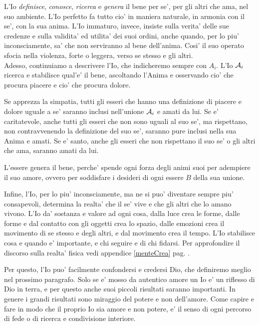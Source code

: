     L'Io \emph{definisce}, \emph{conosce}, \emph{ricerca} e \emph{genera} il bene per se', per gli altri che ama, nel suo ambiente. L'Io perfetto fa tutto cio' in maniera naturale, in armonia con il se', con la sua anima. L'Io immaturo, invece, insiste sulla verita' delle sue credenze e sulla validita' ed utilita' dei suoi ordini, anche quando, per lo piu' inconsciamente, sa' che non serviranno al bene dell'anima. Cosi' il suo operato sfocia nella violenza, forte o leggera, verso se stesso e gli altri.\\

Adesso, continuiamo a descrivere l'Io, che indicheremo sempre con $A_i$. L'Io $\mathcal{A}_i$ ricerca e stabilisce qual'e' il bene, ascoltando l'Anima e osservando cio' che procura piacere e cio' che procura dolore. 

    Se apprezza la simpatia, tutti gli esseri che hanno una definizione di piacere e dolore uguale a se' saranno inclusi nell'unione $\mathcal{A}_i$ e amati da lui. Se e' caritatevole, anche tutti gli esseri che non sono uguali al suo se', ma rispettano, non contravvenendo la definizione del suo se', saranno pure inclusi nella sua Anima e amati. Se e' santo, anche gli esseri che non rispettano il suo se' o gli altri che ama, saranno amati da lui.

    L'essere genera il bene, perche' spende ogni forza degli animi suoi per adempiere il suo amore, ovvero per soddisfare i desideri di ogni essere $B$ della sua unione.

    Infine, l'Io, per lo piu' inconsciamente, ma ne si puo' diventare sempre piu' consapevoli, determina la realta' che il se' vive e che gli altri che lo amano vivono. L'Io da' sostanza e valore ad ogni cosa, dalla luce crea le forme, dalle forme e dal contatto con gli oggetti crea lo spazio, dalle emozioni crea il movimento di se stesso e degli altri, e dal movimento crea il tempo. L'Io stabilisce cosa e quando e' importante, e chi seguire e di chi fidarsi. Per approfondire il discorso sulla realta' fisica vedi appendice \ref{menteCrea} pag. \pageref{menteCrea}.

    Per questo, l'Io puo' facilmente confondersi e credersi Dio, che definiremo meglio nel prossimo paragrafo. Solo se e' mosso da autentico amore un Io e' un riflesso di Dio in terra, e per questo anche suoi piccoli risultati saranno importanti. In genere i grandi risultati sono miraggio del potere e non dell'amore. Come capire e fare in modo che il proprio Io sia amore e non potere, e' il senso di ogni percorso di fede o di ricerca e condivisione interiore. \\

